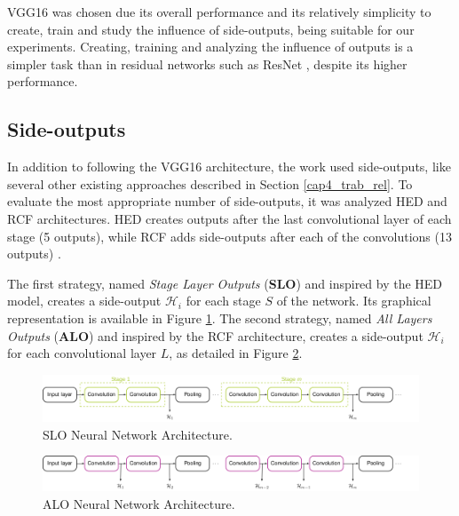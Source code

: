 VGG16 was chosen due its overall performance and its relatively simplicity to create, train and study the influence of side-outputs, being suitable for our experiments. 
Creating, training and analyzing the influence of outputs is a simpler task than in residual networks such as ResNet \cite{RESNET:2016:7780459}, despite its higher performance.

\subsection{Side-outputs}
\label{cap5_saidas_laterais}

In addition to following the VGG16 architecture, the work used side-outputs, like several other existing approaches described in Section \ref{cap4_trab_rel}.
To evaluate the most appropriate number of side-outputs, it was analyzed HED and RCF architectures.
HED creates outputs after the last convolutional layer of each stage (5 outputs), while RCF adds side-outputs after each of the convolutions (13 outputs) \cite{HED:2015} \cite{RCF:2017:8100105}.

The first strategy, named \textit{Stage Layer Outputs} (\textbf{SLO}) and inspired by the HED model, creates a side-output $\mathcal{H}_i$ for each stage $S$ of the network.
Its graphical representation is available in Figure \ref{fig:architecture_slo}.
The second strategy, named \textit{All Layers Outputs} (\textbf{ALO}) and inspired by the RCF architecture, creates a side-output $\mathcal{H}_i$ for each convolutional layer $L$, as detailed in Figure \ref{fig:architecture_alo}.

\begin{figure}
  \centering
  \includegraphics[width=1\textwidth]{../imagens/ilustracoes/cap6_arquitetura_slo.png} %
  \caption{SLO Neural Network Architecture.}
  \label{fig:architecture_slo}
\end{figure}

\begin{figure}
  \centering
  \includegraphics[width=1\textwidth]{../imagens/ilustracoes/cap6_arquitetura_alo.png} %
  \caption{ALO Neural Network Architecture.}
  \label{fig:architecture_alo}
\end{figure}

